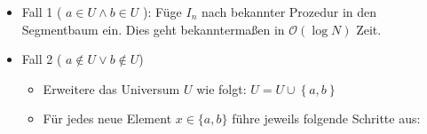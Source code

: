 \documentclass[a4paper]{article}
\begin{document}
\begin{itemize}
 \item Fall 1 ( $a \in U \wedge b \in U$ ): 
    Füge $I_n$ nach bekannter Prozedur in den Segmentbaum ein. Dies geht bekanntermaßen 
    in $\mathcal{O}(\log N)$ Zeit.
 \item Fall 2 ( $a  \notin U \vee b  \notin U$)
    \begin{itemize}
     \item Erweitere das Universum $U$ wie folgt: $U = U \cup \left\{a,b\right\}$
     \item Für jedes neue Element $x \in \{a,b\}$ führe jeweils folgende Schritte aus:
     
	\begin{figure}[!htb]
	\end{figure} 
	

\end{itemize}
\end{itemize}
\end{document}
